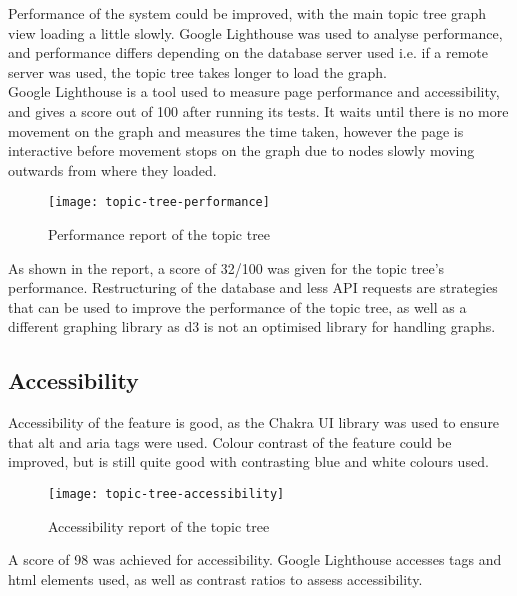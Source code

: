 Performance of the system could be improved, with the main topic tree graph view loading a little slowly. Google Lighthouse was used to analyse performance, and performance differs depending on the database server used i.e. if a remote server was used, the topic tree takes longer to load the graph.\\

Google Lighthouse is a tool used to measure page performance and accessibility, and gives a score out of 100 after running its tests. It waits until there is no more movement on the graph and measures the time taken, however the page is interactive before movement stops on the graph due to nodes slowly moving outwards from where they loaded.\\


\begin{figure}[h!]
    \centering
    \texttt{[image: topic-tree-performance]}
    \caption{Performance report of the topic tree}
\end{figure}

As shown in the report, a score of 32/100 was given for the topic tree's performance. Restructuring of the database and less API requests are strategies that can be used to improve the performance of the topic tree, as well as a different graphing library as d3 is not an optimised library for handling graphs.\\

\subsection{Accessibility}
Accessibility of the feature is good, as the Chakra UI library was used to ensure that alt and aria tags were used. Colour contrast of the feature could be improved, but is still quite good with contrasting blue and white colours used. \\

\begin{figure}[h!]
    \centering
    \texttt{[image: topic-tree-accessibility]}
    \caption{Accessibility report of the topic tree}
\end{figure}

A score of 98 was achieved for accessibility. Google Lighthouse accesses tags and html elements used, as well as contrast ratios to assess accessibility.\\

\subsection{}